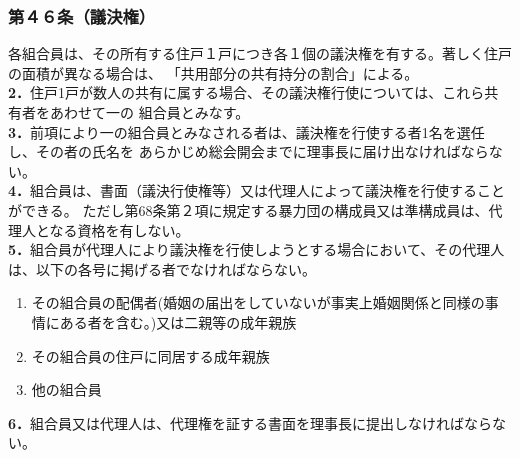 \documentclass[12pt,uplatex,dvipdfmx]{jsarticle}
\begin{document}
\subsubsection*{第４６条（議決権）}
各組合員は、その所有する住戸１戸につき各１個の議決権を有する。著しく住戸の面積が異なる場合は、
「共用部分の共有持分の割合」による。\\
\textbf{2．}住戸1戸が数人の共有に属する場合、その議決権行使については、これら共有者をあわせて一の
組合員とみなす。\\
\textbf{3．}前項により一の組合員とみなされる者は、議決権を行使する者1名を選任し、その者の氏名を
あらかじめ総会開会までに理事長に届け出なければならない。\\
\textbf{4．}組合員は、書面（議決行使権等）又は代理人によって議決権を行使することができる。
ただし第68条第２項に規定する暴力団の構成員又は準構成員は、代理人となる資格を有しない。\\
\textbf{5．}組合員が代理人により議決権を行使しようとする場合において、その代理人は、以下の各号に掲げる者でなければならない。
\begin{enumerate}
  \item その組合員の配偶者(婚姻の届出をしていないが事実上婚姻関係と同様の事情にある者を含む。)又は二親等の成年親族
  \item その組合員の住戸に同居する成年親族
  \item 他の組合員
\end{enumerate}
\textbf{6．}組合員又は代理人は、代理権を証する書面を理事長に提出しなければならない。
\end{document}
